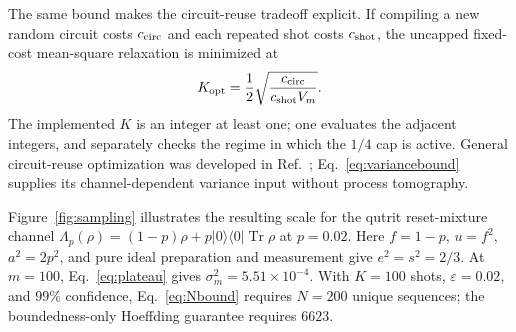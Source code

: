 \documentclass[aps,prl,reprint,superscriptaddress,nofootinbib]{revtex4-2}
\newcommand{\Tr}{\operatorname{Tr}}
\begin{document}
The same bound makes the circuit-reuse tradeoff explicit.  If compiling a new
random circuit costs $c_{\rm circ}$ and each repeated shot costs
$c_{\rm shot}$, the uncapped fixed-cost mean-square relaxation is minimized at
\begin{align}
 K_{\rm opt}=\frac12\sqrt{\frac{c_{\rm circ}}
 {c_{\rm shot}V_m}}.
 \label{eq:Kopt}
\end{align}
The implemented $K$ is an integer at least one; one evaluates the adjacent
integers, and separately checks the regime in which the $1/4$ cap is active.
General circuit-reuse optimization was developed in
Ref.~\cite{ChenEtAl2025}; Eq.~\eqref{eq:variancebound} supplies its
channel-dependent variance input without process tomography.

Figure~\ref{fig:sampling} illustrates the resulting scale for the qutrit
reset-mixture channel
$\Lambda_p(\rho)=(1-p)\rho+p|0\rangle\!\langle0|\Tr\rho$ at $p=0.02$.
Here $f=1-p$, $u=f^2$, $a^2=2p^2$, and pure ideal preparation and measurement
give $e^2=s^2=2/3$.  At $m=100$, Eq.~\eqref{eq:plateau} gives
$\sigma_m^2=5.51\times10^{-4}$.  With $K=100$ shots,
$\varepsilon=0.02$, and $99\%$ confidence, Eq.~\eqref{eq:Nbound} requires
$N=200$ unique sequences; the boundedness-only Hoeffding guarantee requires
$6623$.
\end{document}
